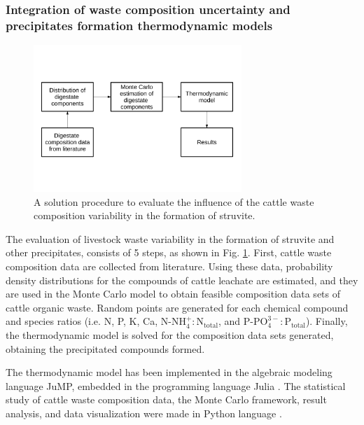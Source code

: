 \begin{refsection}[referencesCh3]
\subsubsection{Integration of waste composition uncertainty and precipitates formation thermodynamic models}
\begin{figure}[h]
	\begin{adjustwidth}{}{} 
		\centering
		\includegraphics[width=0.7\textwidth, trim=0 4.5cm 0 5cm, clip]{gfx/Chapter3/procedure} 
		\caption{A solution procedure to evaluate the influence of the cattle waste composition variability in the formation of struvite.} \label{fig:procedure_schema}
	\end{adjustwidth}{}
\end{figure}
The evaluation of livestock waste variability in the formation of struvite and other precipitates, consists of 5 steps, as shown in Fig. \ref{fig:procedure_schema}. First, cattle waste composition data are collected from literature. Using these data, probability density distributions for the compounds of cattle leachate are estimated, and they are used in the Monte Carlo model to obtain feasible composition data sets of cattle organic waste. Random points are generated for each chemical compound and species ratios (i.e. N, P, K, Ca, $\text{N-NH}_{4}^{+}:\text{N}_\text{total}$, and $\text{P-PO}_{4}^{3-}:\text{P}_{\text{total}}$). 
Finally, the thermodynamic model is solved for the composition data sets generated, obtaining the precipitated compounds formed.

The thermodynamic model has been implemented in the algebraic modeling language JuMP, embedded in the programming language Julia \citep{DunningHuchetteLubin2017, bezanson2017julia}. The statistical study of cattle waste composition data, the Monte Carlo framework, result analysis, and data visualization were made in Python language \citep{Python, Numpy, Matplotlib, Pandas}.


\end{refsection}
